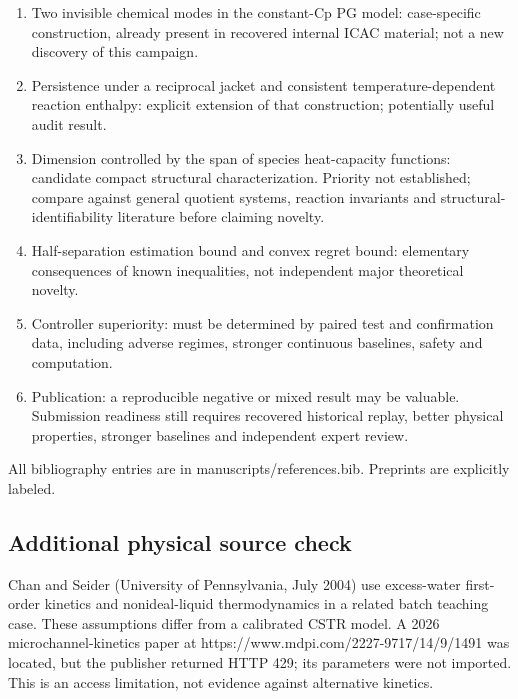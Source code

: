 \documentclass[
  11pt,
]{article}
\providecommand{\tightlist}{%
  \setlength{\itemsep}{0pt}\setlength{\parskip}{0pt}}
\begin{document}
\begin{enumerate}
\def\labelenumi{\arabic{enumi}.}
\tightlist
\item
  Two invisible chemical modes in the constant-Cp PG model:
  case-specific construction, already present in recovered internal ICAC
  material; not a new discovery of this campaign.
\item
  Persistence under a reciprocal jacket and consistent
  temperature-dependent reaction enthalpy: explicit extension of that
  construction; potentially useful audit result.
\item
  Dimension controlled by the span of species heat-capacity functions:
  candidate compact structural characterization. Priority not
  established; compare against general quotient systems, reaction
  invariants and structural-identifiability literature before claiming
  novelty.
\item
  Half-separation estimation bound and convex regret bound: elementary
  consequences of known inequalities, not independent major theoretical
  novelty.
\item
  Controller superiority: must be determined by paired test and
  confirmation data, including adverse regimes, stronger continuous
  baselines, safety and computation.
\item
  Publication: a reproducible negative or mixed result may be valuable.
  Submission readiness still requires recovered historical replay,
  better physical properties, stronger baselines and independent expert
  review.
\end{enumerate}

All bibliography entries are in manuscripts/references.bib. Preprints
are explicitly labeled.

\hypertarget{additional-physical-source-check}{%
\subsection{Additional physical source
check}\label{additional-physical-source-check}}

Chan and Seider (University of Pennsylvania, July 2004) use excess-water
first-order kinetics and nonideal-liquid thermodynamics in a related
batch teaching case. These assumptions differ from a calibrated CSTR
model. A 2026 microchannel-kinetics paper at
https://www.mdpi.com/2227-9717/14/9/1491 was located, but the publisher
returned HTTP 429; its parameters were not imported. This is an access
limitation, not evidence against alternative kinetics.
\end{document}
